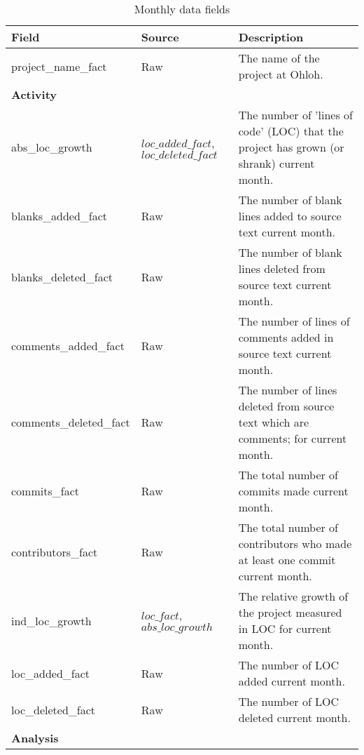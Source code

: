 \begin{table}
	\caption{Monthly data fields}\label{table:fields}
	\begin{tabular}{p{4cm} p{3cm} p{7.5cm}}
		\hline
		\bfseries{Field}\rm & \bfseries{Source}\rm &
		\bfseries{Description}\rm \\ \hline
		
		project\_name\_fact & Raw & The name of the project at Ohloh. \\
		\hline
		
		\bfseries{Activity}\rm \\ \hline

		abs\_loc\_growth & $loc\_added\_fact$, $loc\_deleted\_fact$ & The number of
		'lines of code' (LOC) that the project has grown (or shrank) current month. \\

		blanks\_added\_fact & Raw & The number of blank lines added to source text
		current month. \\

		blanks\_deleted\_fact & Raw & The number of blank lines deleted from source
		text current month. \\

		comments\_added\_fact & Raw & The number of lines of comments added in source
		text current month. \\

		comments\_deleted\_fact & Raw & The number of lines deleted from source text
		which are comments; for current month. \\

		commits\_fact & Raw & The total number of commits made current month. \\

		contributors\_fact & Raw & The total number of contributors who made at least
		one commit current month. \\

		ind\_loc\_growth & $loc\_fact$, $abs\_loc\_growth$ & The relative growth of
		the project measured in LOC for current month. \\

		loc\_added\_fact & Raw & The number of LOC added current month. \\

		loc\_deleted\_fact & Raw & The number of LOC deleted current month. \\
		\hline
		
		\bfseries{Analysis}\rm \\ \hline


\end{tabular}
\end{table}
